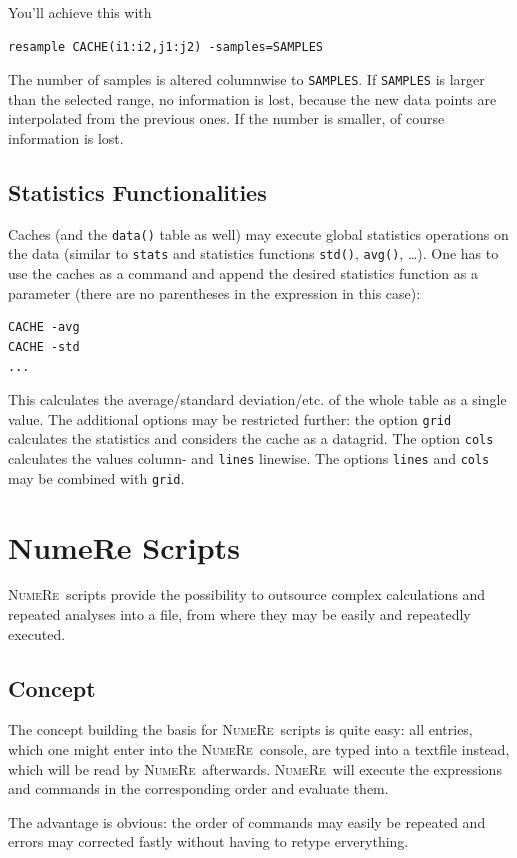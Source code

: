 \documentclass[DIV=14,headsepline,footsepline]{scrbook}
\newcommand{\NR}{\textsc{Nu\-me\-Re}}
\begin{document}
				You'll achieve this with
				\begin{lstlisting}
resample CACHE(i1:i2,j1:j2) -samples=SAMPLES
				\end{lstlisting}
				The number of samples is altered columnwise to \lstinline+SAMPLES+. If \lstinline+SAMPLES+ is larger than the selected range, no information is lost, because the new data points are interpolated from the previous ones. If the number is smaller, of course information is lost.
				
			\section{Statistics Functionalities}
				Caches (and the \lstinline+data()+ table as well) may execute global statistics operations on the data (similar to \lstinline+stats+ and statistics functions \lstinline+std()+, \lstinline+avg()+, \ldots). One has to use the caches as a command and append the desired statistics function as a parameter (there are no parentheses in the expression in this case):
				\begin{lstlisting}
CACHE -avg
CACHE -std
...
				\end{lstlisting}
				This calculates the average/standard deviation/etc. of the whole table as a single value. The additional options may be restricted further: the option \lstinline+grid+ calculates the statistics and considers the cache as a datagrid. The option \lstinline+cols+ calculates the values column- and \lstinline+lines+ linewise. The options \lstinline+lines+ and \lstinline+cols+ may be combined with \lstinline+grid+.
		\chapter{NumeRe Scripts}
			\NR\ scripts provide the possibility to outsource complex calculations and repeated analyses into a file, from where they may be easily and repeatedly executed.
			\section{Concept}
				The concept building the basis for \NR\ scripts is quite easy: all entries, which one might enter into the \NR\ console, are typed into a textfile instead, which will be read by \NR\ afterwards. \NR\ will execute the expressions and commands in the corresponding order and evaluate them.
				
				The advantage is obvious: the order of commands may easily be repeated and errors may corrected fastly without having to retype erverything.
\end{document}
